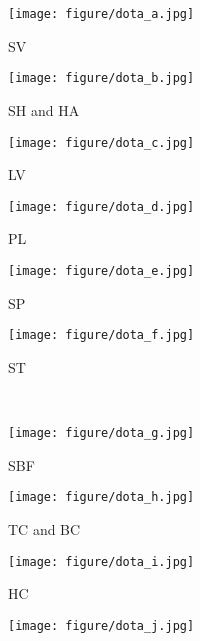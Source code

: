 \documentclass[10pt,twocolumn,letterpaper]{article}
\begin{document}
	\begin{figure*}[t]
		\centering
		\begin{subfigure}{.15\textwidth}
			\centering
			\texttt{[image: figure/dota\_a.jpg]}
			\caption{SV}
			\label{fig:dota_a}
		\end{subfigure}\begin{subfigure}{.15\textwidth}
			\centering
			\texttt{[image: figure/dota\_b.jpg]}
			\caption{SH and HA}
			\label{fig:dota_b}
		\end{subfigure}
		\begin{subfigure}{.15\textwidth}
			\centering
			\texttt{[image: figure/dota\_c.jpg]}
			\caption{LV}
			\label{fig:dota_c}
		\end{subfigure}\begin{subfigure}{.15\textwidth}
			\centering
			\texttt{[image: figure/dota\_d.jpg]}
			\caption{PL}
			\label{fig:dota_d}
		\end{subfigure}
		\begin{subfigure}{.15\textwidth}
			\centering
			\texttt{[image: figure/dota\_e.jpg]}
			\caption{SP}
			\label{fig:dota_e}
		\end{subfigure}\begin{subfigure}{.15\textwidth}
			\centering
			\texttt{[image: figure/dota\_f.jpg]}
			\caption{ST}
			\label{fig:dota_f}
		\end{subfigure}\\
		\begin{subfigure}{.15\textwidth}
			\centering
			\texttt{[image: figure/dota\_g.jpg]}
			\caption{SBF}
			\label{fig:dota_g}
		\end{subfigure}\begin{subfigure}{.15\textwidth}
			\centering
			\texttt{[image: figure/dota\_h.jpg]}
			\caption{TC and BC}
			\label{fig:dota_h}
		\end{subfigure}
		\begin{subfigure}{.15\textwidth}
			\centering
			\texttt{[image: figure/dota\_i.jpg]}
			\caption{HC}
			\label{fig:dota_i}
		\end{subfigure}\begin{subfigure}{.15\textwidth}
			\centering
			\texttt{[image: figure/dota\_j.jpg]}

\end{subfigure}
\end{figure*}
\end{document}
